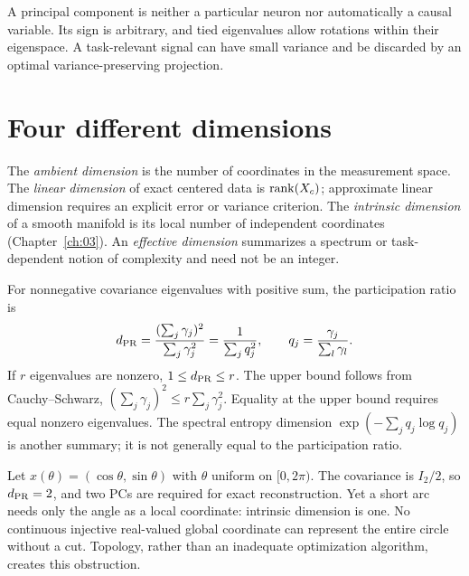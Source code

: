 \begin{misconception}
A principal component is neither a particular neuron nor automatically a causal variable. Its sign is arbitrary, and tied eigenvalues allow rotations within their eigenspace. A task-relevant signal can have small variance and be discarded by an optimal variance-preserving projection.
\end{misconception}

\section{Four different dimensions}
\begin{definition}
The \emph{ambient dimension} is the number of coordinates in the measurement space. The \emph{linear dimension} of exact centered data is $\operatorname{rank}(X_c)$; approximate linear dimension requires an explicit error or variance criterion. The \emph{intrinsic dimension} of a smooth manifold is its local number of independent coordinates (Chapter~\ref{ch:03}). An \emph{effective dimension} summarizes a spectrum or task-dependent notion of complexity and need not be an integer.
\end{definition}
For nonnegative covariance eigenvalues with positive sum, the participation ratio is
\begin{equation}\label{eq:participation-ratio}
d_{\rm PR}=\frac{(\sum_j\gamma_j)^2}{\sum_j\gamma_j^2}
=\frac{1}{\sum_jq_j^2},\qquad q_j=\frac{\gamma_j}{\sum_l\gamma_l}.
\end{equation}
If $r$ eigenvalues are nonzero, $1\leq d_{\rm PR}\leq r$. The upper bound follows from Cauchy--Schwarz, $(\sum_j\gamma_j)^2\leq r\sum_j\gamma_j^2$. Equality at the upper bound requires equal nonzero eigenvalues. The spectral entropy dimension $\exp(-\sum_jq_j\log q_j)$ is another summary; it is not generally equal to the participation ratio.

\begin{example}
Let $x(\theta)=(\cos\theta,\sin\theta)$ with $\theta$ uniform on $[0,2\pi)$. The covariance is $I_2/2$, so $d_{\rm PR}=2$, and two PCs are required for exact reconstruction. Yet a short arc needs only the angle as a local coordinate: intrinsic dimension is one. No continuous injective real-valued global coordinate can represent the entire circle without a cut. Topology, rather than an inadequate optimization algorithm, creates this obstruction.
\end{example}

